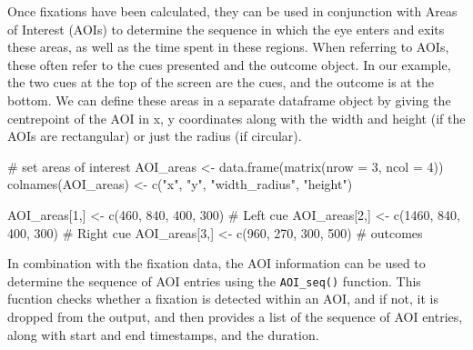 \documentclass[
  man,
  floatsintext,
  longtable,
  nolmodern,
  notxfonts,
  notimes,
  colorlinks=true,linkcolor=blue,citecolor=blue,urlcolor=blue]{apa7}
\newenvironment{Shaded}{\begin{snugshade}}{\end{snugshade}}
\newcommand{\AttributeTok}[1]{\textcolor[rgb]{0.40,0.45,0.13}{#1}}
\newcommand{\CommentTok}[1]{\textcolor[rgb]{0.37,0.37,0.37}{#1}}
\newcommand{\DecValTok}[1]{\textcolor[rgb]{0.68,0.00,0.00}{#1}}
\newcommand{\FunctionTok}[1]{\textcolor[rgb]{0.28,0.35,0.67}{#1}}
\newcommand{\NormalTok}[1]{\textcolor[rgb]{0.00,0.23,0.31}{#1}}
\newcommand{\OtherTok}[1]{\textcolor[rgb]{0.00,0.23,0.31}{#1}}
\newcommand{\StringTok}[1]{\textcolor[rgb]{0.13,0.47,0.30}{#1}}
\begin{document}
Once fixations have been calculated, they can be used in conjunction
with Areas of Interest (AOIs) to determine the sequence in which the eye
enters and exits these areas, as well as the time spent in these
regions. When referring to AOIs, these often refer to the cues presented
and the outcome object. In our example, the two cues at the top of the
screen are the cues, and the outcome is at the bottom. We can define
these areas in a separate dataframe object by giving the centrepoint of
the AOI in x, y coordinates along with the width and height (if the AOIs
are rectangular) or just the radius (if circular).

\begin{Shaded}
\begin{Highlighting}[]
\CommentTok{\# set areas of interest}
\NormalTok{AOI\_areas }\OtherTok{\textless{}{-}} \FunctionTok{data.frame}\NormalTok{(}\FunctionTok{matrix}\NormalTok{(}\AttributeTok{nrow =} \DecValTok{3}\NormalTok{, }\AttributeTok{ncol =} \DecValTok{4}\NormalTok{))}
\FunctionTok{colnames}\NormalTok{(AOI\_areas) }\OtherTok{\textless{}{-}} \FunctionTok{c}\NormalTok{(}\StringTok{"x"}\NormalTok{, }\StringTok{"y"}\NormalTok{, }\StringTok{"width\_radius"}\NormalTok{, }\StringTok{"height"}\NormalTok{)}

\NormalTok{AOI\_areas[}\DecValTok{1}\NormalTok{,] }\OtherTok{\textless{}{-}} \FunctionTok{c}\NormalTok{(}\DecValTok{460}\NormalTok{, }\DecValTok{840}\NormalTok{, }\DecValTok{400}\NormalTok{, }\DecValTok{300}\NormalTok{) }\CommentTok{\# Left cue}
\NormalTok{AOI\_areas[}\DecValTok{2}\NormalTok{,] }\OtherTok{\textless{}{-}} \FunctionTok{c}\NormalTok{(}\DecValTok{1460}\NormalTok{, }\DecValTok{840}\NormalTok{, }\DecValTok{400}\NormalTok{, }\DecValTok{300}\NormalTok{) }\CommentTok{\# Right cue}
\NormalTok{AOI\_areas[}\DecValTok{3}\NormalTok{,] }\OtherTok{\textless{}{-}} \FunctionTok{c}\NormalTok{(}\DecValTok{960}\NormalTok{, }\DecValTok{270}\NormalTok{, }\DecValTok{300}\NormalTok{, }\DecValTok{500}\NormalTok{) }\CommentTok{\# outcomes}
\end{Highlighting}
\end{Shaded}

In combination with the fixation data, the AOI information can be used
to determine the sequence of AOI entries using the \texttt{AOI\_seq()}
function. This fucntion checks whether a fixation is detected within an
AOI, and if not, it is dropped from the output, and then provides a list
of the sequence of AOI entries, along with start and end timestamps, and
the duration.
\end{document}
